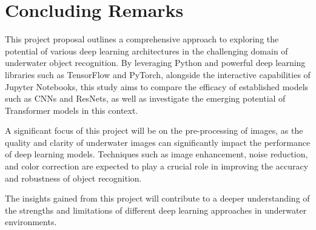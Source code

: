 \section{Concluding Remarks}

This project proposal outlines a comprehensive approach to exploring the
potential of various deep learning architectures in the challenging domain of
underwater object recognition. By leveraging Python and powerful deep learning
libraries such as TensorFlow and PyTorch, alongside the interactive capabilities of
Jupyter Notebooks, this study aims to compare the efficacy of established models such as CNNs and ResNets, as well as investigate the emerging potential of Transformer models in this context.

A significant focus of this project will be on the pre-processing of images,
as the quality and clarity of underwater images can significantly impact
the performance of deep learning models.
Techniques such as image enhancement, noise reduction, and color correction are
expected to play a crucial role in improving the accuracy and robustness
of object recognition.

The insights gained from this project will contribute to a deeper understanding
of the strengths and limitations of different deep learning approaches in underwater
environments.